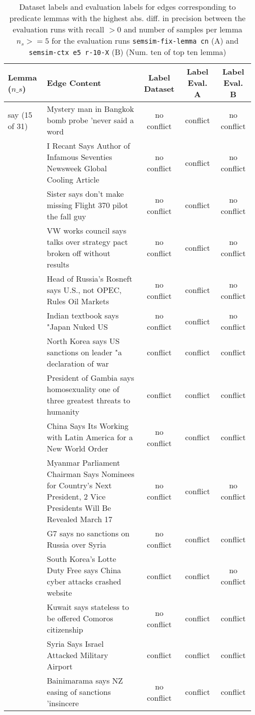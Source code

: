 \begin{sidewaystable}[ht]
\centering
\begin{tabular}{l p{13cm} ccc}
\toprule
Lemma (\(n\_s\)) & Edge Content & Label Dataset & Label Eval. A & Label Eval. B \\
\midrule
say (15 of 31)
& Mystery man in Bangkok bomb probe 'never said a word & no conflict & conflict & no conflict \\
& I Recant Says Author of Infamous Seventies Newsweek Global Cooling Article & no conflict & conflict & no conflict \\
& Sister says don't make missing Flight 370 pilot the fall guy & no conflict & conflict & no conflict \\
& VW works council says talks over strategy pact broken off without results & no conflict & conflict & no conflict \\
& Head of Russia's Rosneft says U.S., not OPEC, Rules Oil Markets & no conflict & conflict & no conflict \\
& Indian textbook says "Japan Nuked US & no conflict & conflict & no conflict \\
& North Korea says US sanctions on leader "a declaration of war & conflict & conflict & conflict \\
& President of Gambia says homosexuality one of three greatest threats to humanity & conflict & conflict & conflict \\
& China Says Its Working with Latin America for a New World Order & no conflict & conflict & conflict \\
& Myanmar Parliament Chairman Says Nominees for Country's Next President, 2 Vice Presidents Will Be Revealed March 17 & no conflict & conflict & no conflict \\
& G7 says no sanctions on Russia over Syria & no conflict & conflict & conflict \\
& South Korea's Lotte Duty Free says China cyber attacks crashed website & conflict & conflict & no conflict \\
& Kuwait says stateless to be offered Comoros citizenship & no conflict & conflict & conflict \\
& Syria Says Israel Attacked Military Airport & conflict & conflict & conflict \\
& Bainimarama says NZ easing of sanctions 'insincere & no conflict & conflict & conflict \\
\bottomrule
\end{tabular}
\caption{Dataset labels and evaluation labels for edges corresponding to predicate lemmas with the highest abs. diff. in precision between the evaluation runs with recall \(> 0\) and number of samples per lemma \(n_s >= 5\) for the evaluation runs \texttt{semsim-fix-lemma cn} (A) and \texttt{semsim-ctx e5 r-10-X} (B) (Num. ten of top ten lemma)}
\end{sidewaystable}

